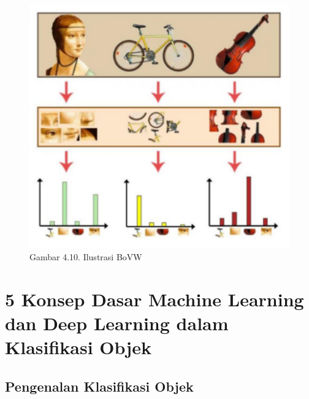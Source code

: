 \documentclass[
  letterpaper,
  DIV=11,
  numbers=noendperiod]{scrreprt}
\begin{document}
\begin{figure}

{\centering \includegraphics{Asset/image118.png}

}

\caption{Gambar 4.10. Ilustrasi BoVW}

\end{figure}

\hypertarget{konsep-dasar-machine-learning-dan-deep-learning-dalam-klasifikasi-objek}{%
\chapter*{5 Konsep Dasar Machine Learning dan Deep Learning dalam
Klasifikasi
Objek}\label{konsep-dasar-machine-learning-dan-deep-learning-dalam-klasifikasi-objek}}


\hypertarget{pengenalan-klasifikasi-objek}{%
\section*{Pengenalan Klasifikasi
Objek}\label{pengenalan-klasifikasi-objek}}

\end{document}
